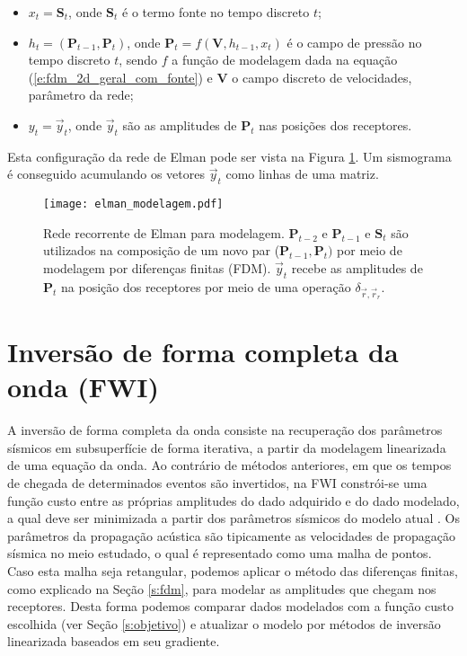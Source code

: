     \begin{itemize}
      \item $x_t = \boldsymbol{S}_{t}$, onde $\boldsymbol{S}_t$ é o termo fonte no tempo discreto $t$;
      \item $h_t = (\boldsymbol{P}_{t-1}, \boldsymbol{P}_{t})$, onde $\boldsymbol{P}_{t} = f(\boldsymbol{V},h_{t-1}, x_t)$ é o campo de pressão no tempo discreto $t$, sendo $f$ a função de modelagem dada na equação (\ref{e:fdm_2d_geral_com_fonte}) e $\boldsymbol{V}$ o campo discreto de velocidades, parâmetro da rede;
      \item $y_t = \vec{y}_t$, onde $\vec{y}_t$ são as amplitudes de $\boldsymbol{P}_{t}$ nas posições dos receptores.
    \end{itemize}

    \noindent Esta configuração da rede de Elman pode ser vista na Figura \ref{f:elman_modelagem}. Um sismograma é conseguido acumulando os vetores $\vec{y}_t$ como linhas de uma matriz.

      \begin{figure}
        \begin{center}
          \texttt{[image: elman\_modelagem.pdf]}
        \end{center}
        \caption{Rede recorrente de Elman para modelagem. $\boldsymbol{P}_{t-2}$ e $\boldsymbol{P}_{t-1}$ e $\boldsymbol{S}_t$ são utilizados na composição de um novo par ($\boldsymbol{P}_{t-1}, \boldsymbol{P}_{t})$ por meio de modelagem por diferenças finitas (FDM). $\vec{y}_t$ recebe as amplitudes de $\boldsymbol{P}_{t}$ na posição dos receptores por meio de uma operação $\delta_{\vec{r}, \vec{r}_r}$.}
        \label{f:elman_modelagem}
      \end{figure}

  \section{Inversão de forma completa da onda (FWI)}

    A inversão de forma completa da onda consiste na recuperação dos parâmetros sísmicos em subsuperfície de forma iterativa, a partir da modelagem linearizada de uma equação da onda. Ao contrário de métodos anteriores, em que os tempos de chegada de determinados eventos são invertidos, na FWI constrói-se uma função custo entre as próprias amplitudes do dado adquirido e do dado modelado, a qual deve ser minimizada a partir dos parâmetros sísmicos do modelo atual . Os parâmetros da propagação acústica são tipicamente as velocidades de propagação sísmica no meio estudado, o qual é representado como uma malha de pontos. Caso esta malha seja retangular, podemos aplicar o método das diferenças finitas, como explicado na Seção \ref{s:fdm}, para modelar as amplitudes que chegam nos receptores. Desta forma podemos comparar dados modelados com a função custo escolhida (ver Seção \ref{s:objetivo}) e atualizar o modelo por métodos de inversão linearizada baseados em seu gradiente.

